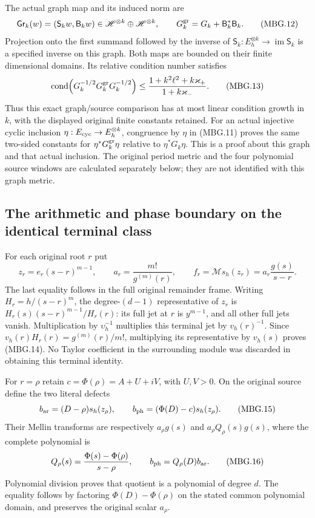 The actual graph map and its induced norm are
\[
 \mathsf{Gr}_k(w)=(\mathsf S_k w,\mathsf B_k w)
       \in\mathscr H^{\otimes k}\oplus\mathscr H^{\otimes k},\qquad
 G_k^{\rm gr}=G_k+\mathsf B_k^*\mathsf B_k .
 \tag{MBG.12}\label{eq:mbg-graph}
\]
Projection onto the first summand followed by the inverse of
\(\mathsf S_k:E_h^{\otimes k}\to\operatorname{im}\mathsf S_k\)
is a specified inverse on this graph. Both maps are bounded on their
finite dimensional domains. Its relative condition number satisfies
\[
 \operatorname{cond}\!\left(G_k^{-1/2}G_k^{\rm gr}G_k^{-1/2}\right)
 \le
 \frac{1+k^2\ell^2+k\varkappa_+}{1+k\varkappa_-}.
 \tag{MBG.13}\label{eq:mbg-graph-condition}
\]
Thus this exact graph/source comparison has at most linear condition
growth in \(k\), with the displayed original finite constants retained.
For an actual injective cyclic inclusion \(\eta:E_{\rm cyc}\to
E_h^{\otimes k}\), congruence by \(\eta\) in (MBG.11) proves the same
two-sided constants for
\(\eta^*G_k^{\rm gr}\eta\) relative to \(\eta^*G_k\eta\).
This is a proof about this graph and that actual inclusion. The original
period metric and the four polynomial source windows are calculated
separately below; they are not identified with this graph metric.

\subsection{The arithmetic and phase boundary on the identical terminal class}

For each original root \(r\) put
\[
 z_r=e_r(s-r)^{m-1},\qquad
 a_r=\frac{m!}{g^{(m)}(r)},\qquad
 f_r=\mathcal M s_h(z_r)=a_r\frac{g(s)}{s-r}.
 \tag{MBG.14}\label{eq:mbg-terminal}
\]
The last equality follows in the full original remainder frame.
Writing \(H_r=h/(s-r)^m\), the degree-\((d-1)\) representative of
\(z_r\) is \(H_r(s)(s-r)^{m-1}/H_r(r)\): its full jet at \(r\)
is \(y^{m-1}\), and all other full jets vanish. Multiplication by
\(\upsilon_h^{-1}\) multiplies this terminal jet by \(v_h(r)^{-1}\).
Since \(v_h(r)H_r(r)=g^{(m)}(r)/m!\), multiplying its representative
by \(v_h(s)\) proves (MBG.14). No Taylor coefficient in the surrounding
module was discarded in obtaining this terminal identity.

For \(r=\rho\) retain \(c=\Phi(\rho)=A+U+iV\), with \(U,V>0\).
On the original source define the two literal defects
\[
 b_{\rm ar}=(D-\rho)s_h(z_\rho),\qquad
 b_{\rm ph}=(\Phi(D)-c)s_h(z_\rho).
 \tag{MBG.15}\label{eq:mbg-two-defects}
\]
Their Mellin transforms are respectively \(a_\rho g(s)\) and
\(a_\rho Q_\rho(s)g(s)\), where the complete polynomial is
\[
 Q_\rho(s)=\frac{\Phi(s)-\Phi(\rho)}{s-\rho},\qquad
 b_{\rm ph}=Q_\rho(D)b_{\rm ar}.
 \tag{MBG.16}\label{eq:mbg-divided-difference}
\]
Polynomial division proves that quotient is a polynomial of degree
\(d\). The equality follows by factoring \(\Phi(D)-\Phi(\rho)\)
on the stated common polynomial domain, and preserves the original
scalar \(a_\rho\).

